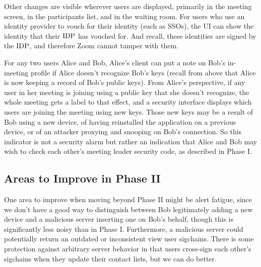 Other changes are visible wherever users are displayed, primarily in the meeting screen, in the participants list, and in the waiting room. For users who use an identity provider to vouch for their identity (such as SSOs), the UI can show the identity that their $\mathrm{IDP}$ has vouched for. And recall, these identities are signed by the $\mathrm{IDP}$, and therefore Zoom cannot tamper with them.

For any two users Alice and Bob, Alice's client can put a note on Bob's in-meeting profile if Alice doesn't recognize Bob's keys (recall from above that Alice is now keeping a record of Bob's public keys). From Alice's perspective, if any user in her meeting is joining using a public key that she doesn't recognize, the whole meeting gets a label to that effect, and a security interface displays which users are joining the meeting using new keys.  Those new keys may be a result of Bob using a new device, of having reinstalled the application on a previous device, or of an attacker proxying and snooping on Bob's connection. So this indicator is not a security alarm but rather an indication that Alice and Bob may wish to check each other's meeting leader security code, as described in Phase I.

\subsection{Areas to Improve in Phase II}

One area to improve when moving beyond Phase II might be alert fatigue, since we don't have a good way to distinguish between Bob legitimately adding a new device and a malicious server inserting one on Bob's behalf, though this is significantly less noisy than in Phase I. Furthermore, a malicious server could potentially return an outdated or inconsistent view user sigchains. There is some protection against arbitrary server behavior in that users cross-sign each other's sigchains when they update their contact lists, but we can do better.
